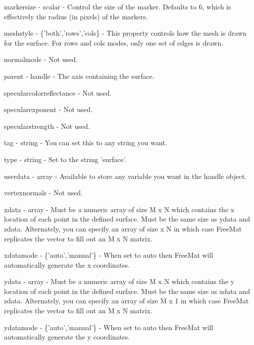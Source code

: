 \begin{DoxyItemize}
\item {\ttfamily markersize} -\/ {\ttfamily scalar} -\/ Control the size of the marker. Defaults to 6, which is effectively the radius (in pixels) of the markers.  
\item {\ttfamily meshstyle} -\/ {\ttfamily \{'both','rows','cols\}} -\/ This property controls how the mesh is drawn for the surface. For {\ttfamily rows} and {\ttfamily cols} modes, only one set of edges is drawn.  
\item {\ttfamily normalmode} -\/ Not used.  
\item {\ttfamily parent} -\/ {\ttfamily handle} -\/ The axis containing the surface.  
\item {\ttfamily specularcolorreflectance} -\/ Not used.  
\item {\ttfamily specularexponent} -\/ Not used.  
\item {\ttfamily specularstrength} -\/ Not used.  
\item {\ttfamily tag} -\/ {\ttfamily string} -\/ You can set this to any string you want.  
\item {\ttfamily type} -\/ {\ttfamily string} -\/ Set to the string {\ttfamily 'surface'}.  
\item {\ttfamily userdata} -\/ {\ttfamily array} -\/ Available to store any variable you want in the handle object.  
\item {\ttfamily vertexnormals} -\/ Not used.  
\item {\ttfamily xdata} -\/ {\ttfamily array} -\/ Must be a numeric array of size {\ttfamily M x N} which contains the x location of each point in the defined surface. Must be the same size as {\ttfamily ydata} and {\ttfamily zdata}. Alternately, you can specify an array of size { x N} in which case Free\-Mat replicates the vector to fill out an {\ttfamily M x N} matrix.  
\item {\ttfamily xdatamode} -\/ {\ttfamily \{'auto','manual'\}} -\/ When set to {\ttfamily auto} then Free\-Mat will automatically generate the x coordinates.  
\item {\ttfamily ydata} -\/ {\ttfamily array} -\/ Must be a numeric array of size {\ttfamily M x N} which contains the y location of each point in the defined surface. Must be the same size as {\ttfamily xdata} and {\ttfamily zdata}. Alternately, you can specify an array of size {\ttfamily M x 1} in which case Free\-Mat replicates the vector to fill out an {\ttfamily M x N} matrix.  
\item {\ttfamily ydatamode} -\/ {\ttfamily \{'auto','manual'\}} -\/ When set to {\ttfamily auto} then Free\-Mat will automatically generate the y coordinates.  

\end{DoxyItemize}
